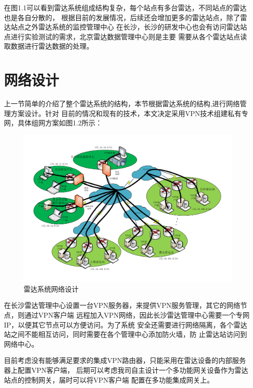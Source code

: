 \documentclass[a4paper,12pt]{report}
\begin{document}
\begin{spacing}{1.5}
在图1.1可以看到雷达系统组成结构复杂，每个站点有多台雷达，不同站点的雷达也是各自分散的，
根据目前的发展情况，后续还会增加更多的雷达站点，除了雷达站点之外雷达系统的监控管理中心
在长沙，长沙的研发中心也会有访问雷达站点进行实验测试的需求，北京雷达数据管理中心则是主要
需要从各个雷达站点读取数据进行雷达数据的处理。

\section{网络设计}
上一节简单的介绍了整个雷达系统的结构，本节根据雷达系统的结构,进行网络管理方案设计。针对
目前的情况和现有的技术，本文决定采用VPN技术组建私有专网，具体组网方案如图1.2所示：
\begin{figure}[hbtp]
	\centering
	\includegraphics [width=1.0\textwidth]{figure//RadarNet.pdf}
	\caption{雷达系统网络设计}\label{RadarNet}
\end{figure}

在长沙雷达管理中心设置一台VPN服务器，来提供VPN服务管理，其它的网络节点，则通过VPN客户端
远程加入VPN网络，因此长沙雷达管理中心需要一个专网IP，以便其它节点可以方便访问。为了系统
安全还需要进行网络隔离，各个雷达站之间不能相互访问，同时需要在各个管理中心添加防火墙，防
止雷达站访问到网络中心。

目前考虑没有能够满足要求的集成VPN路由器，只能采用在雷达设备的内部服务器上配置VPN客户端，
后期可以考虑我司自主设计一个多功能网关设备作为雷达站点的控制网关，届时可以将VPN客户端
配置在多功能集成网关上。


\end{spacing}
\end{document}
